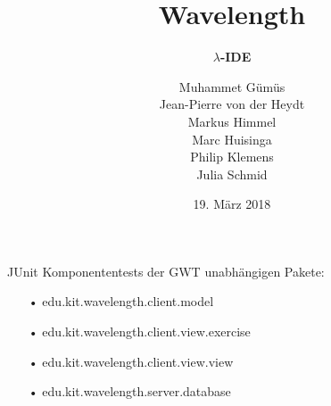 \documentclass[10pt]{beamer}
\title[] %
{ %
      \textbf{Wavelength}
}
\subtitle[$\lambda$-IDE]
{
      \textbf{$\lambda$-IDE}
}
\author[wavelength]
{     
      Muhammet Gümüs \\
      Jean-Pierre von der Heydt \\  
       Markus Himmel \\
       Marc Huisinga \\
       Philip Klemens \\ 
       Julia Schmid   }
\institute[]
{
      
  
}
\date{19. März 2018}
\begin{document}

{
\begin{frame}[plain]
\maketitle
\end{frame}
}

\begin{frame}{JUnit}
Komponententests der GWT unabhängigen Pakete:
\begin{itemize}
\item[•] edu.kit.wavelength.client.model
\item[•] edu.kit.wavelength.client.view.exercise
\item[•] edu.kit.wavelength.client.view.view
\item[•] edu.kit.wavelength.server.database
\end{itemize}
\end{frame}
\end{document}
